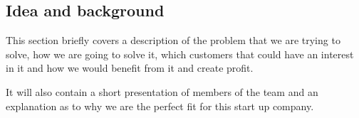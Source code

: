 \subsection{Idea and background}
This section briefly covers a description of the problem that we are trying to solve, how we are going to solve it, which customers that could have an interest in it and how we would benefit from it and create profit.

It will also contain a short presentation of members of the team and an explanation as to why we are the perfect fit for this start up company.

